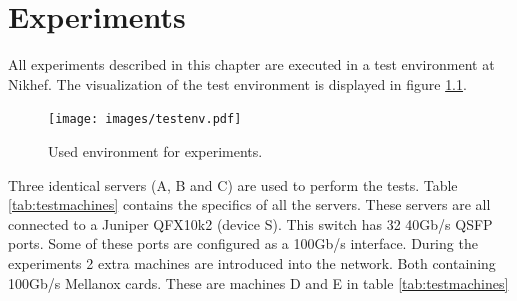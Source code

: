 \chapter{Experiments}\label{ch:experiments}
All experiments described in this chapter are executed in a test environment at Nikhef. The visualization of the test environment is displayed in figure \ref{fig:testenv}. \\ 

\begin{figure}[H]
  \texttt{[image: images/testenv.pdf]}
  \caption{Used environment for experiments.}
  \label{fig:testenv}
\end{figure}

Three identical servers (A, B and C)  are used to perform the tests. Table \ref{tab:testmachines} contains the specifics of all the servers. 
These servers are all connected to a Juniper QFX10k2 (device S). This switch has 32 40Gb/s QSFP ports. 
Some of these ports are configured as a 100Gb/s interface. 
During the experiments 2 extra machines are introduced into the network. Both containing 100Gb/s Mellanox cards. 
These are machines D and E in table \ref{tab:testmachines} \\


